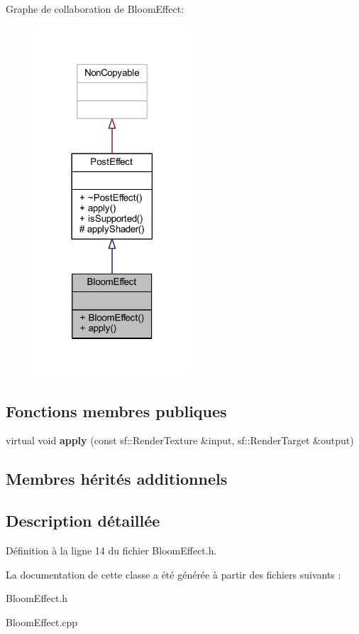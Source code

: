 Graphe de collaboration de Bloom\+Effect\+:\nopagebreak
\begin{figure}[H]
\begin{center}
\leavevmode
\includegraphics[width=165pt]{class_bloom_effect__coll__graph}
\end{center}
\end{figure}
\subsection*{Fonctions membres publiques}
\begin{DoxyCompactItemize}
\item 
\hypertarget{class_bloom_effect_add417d9fc98d72bf26bcab5e098de8c3}{}\label{class_bloom_effect_add417d9fc98d72bf26bcab5e098de8c3} 
virtual void {\bfseries apply} (const sf\+::\+Render\+Texture \&input, sf\+::\+Render\+Target \&output)
\end{DoxyCompactItemize}
\subsection*{Membres hérités additionnels}


\subsection{Description détaillée}


Définition à la ligne 14 du fichier Bloom\+Effect.\+h.



La documentation de cette classe a été générée à partir des fichiers suivants \+:\begin{DoxyCompactItemize}
\item 
Bloom\+Effect.\+h\item 
Bloom\+Effect.\+cpp\end{DoxyCompactItemize}
